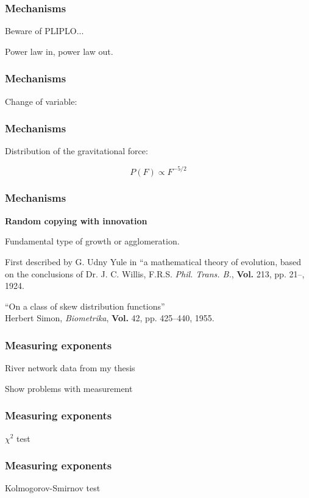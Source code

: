 \begin{frame}
  \frametitle{Mechanisms}

  Beware of PLIPLO...

  Power law in, power law out.

\end{frame}

\begin{frame}
  \frametitle{Mechanisms}

  Change of variable:

\end{frame}

\begin{frame}
  \frametitle{Mechanisms}

  Distribution of the gravitational force:

  $$ P(F) \propto F^{-5/2} $$


\end{frame}

\begin{frame}
  \frametitle{Mechanisms}

  \textbf{Random copying with innovation}

  Fundamental type of growth or agglomeration.

  First described by G. Udny Yule in 
  ``a mathematical theory of evolution, based on the 
  conclusions of Dr. J. C. Willis, F.R.S.
  \textit{Phil. Trans. B.}, \textbf{Vol.} 213, pp. 21--, 1924.

  ``On a class of skew distribution functions''\\
  Herbert Simon, \textit{Biometrika}, \textbf{Vol.} 42, pp. 425--440, 1955.

\end{frame}

\begin{frame}
  \frametitle{Measuring exponents}

  River network data from my thesis

  Show problems with measurement



\end{frame}

\begin{frame}
  \frametitle{Measuring exponents}

  $\chi^2$ test

\end{frame}

\begin{frame}
  \frametitle{Measuring exponents}

  Kolmogorov-Smirnov test


\end{frame}

